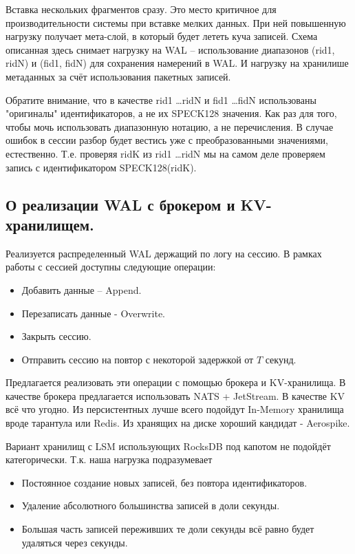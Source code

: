 \documentclass[a4paper,12pt]{article}
\begin{document}
    Вставка нескольких фрагментов сразу. Это место критичное для производительности системы при вставке мелких данных. При ней повышенную
    нагрузку получает мета-слой, в который будет лететь куча записей. Схема описанная здесь снимает нагрузку на WAL – использование диапазонов
    (rid1, ridN) и (fid1, fidN) для сохранения намерений в WAL. И нагрузку на хранилише метаданных за счёт использования пакетных записей.

    Обратите внимание, что в качестве rid1 \dots ridN и fid1 \dots fidN использованы "оригиналы" идентификаторов, а не их SPECK128 значения. Как раз для
    того, чтобы мочь использовать диапазонную нотацию, а не перечисления. В случае ошибок в сессии разбор будет вестись уже с преобразованными значениями,
    естественно. Т.е. проверяя ridK из rid1 \dots ridN мы на самом деле проверяем запись с идентификатором SPECK128(ridK).

    \subsection{О реализации WAL с брокером и KV-хранилищем.}

    Реализуется распределенный WAL держащий по логу на сессию. В рамках работы с сессией доступны следующие операции:

    \begin{itemize}
        \item Добавить данные – Append.
        \item Перезаписать данные - Overwrite.
        \item Закрыть сессию.
        \item Отправить сессию на повтор с некоторой задержкой от $T$ секунд.
    \end{itemize}

    Предлагается реализовать эти операции с помощью брокера и KV-хранилища. В качестве брокера предлагается использовать NATS + JetStream.
    В качестве KV всё что угодно. Из персистентных лучше всего подойдут In-Memory хранилища вроде тарантула или Redis. Из хранящих
    на диске хороший кандидат - Aerospike.

    Вариант хранилищ с LSM использующих RocksDB под капотом не подойдёт категорически. Т.к. наша нагрузка подразумевает

    \begin{itemize}
        \item Постоянное создание новых записей, без повтора идентификаторов.
        \item Удаление абсолютного большинства записей в доли секунды.
        \item Большая часть записей переживших те доли секунды всё равно будет удаляться через секунды.
    \end{itemize}
\end{document}
